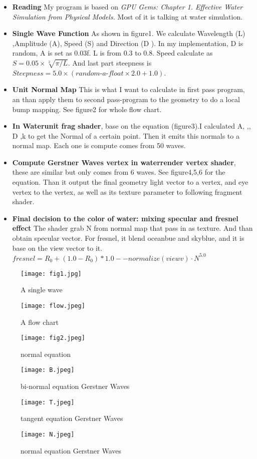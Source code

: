 \documentclass[12pt,letterpaper]{article}
\begin{document}
\begin{itemize}
\item \textbf{Reading} My program is based on \textit{GPU Gems: Chapter 1. Effective Water Simulation from Physical Models.} Most of it is talking at water simulation. 
\item \textbf{Single Wave Function} As shown in figure1. We calculate Wavelength (L) ,Amplitude (A), Speed (S) and Direction (D ). In my implementation, D is random, A is set as 0.03f. L is from 0.3 to 0.8. Speed calculate as $S = 0.05 \times \sqrt[2]{\pi/L}$. And last part steepness is $ Steepness = 5.0\times (\textit{random-a-float}\times 2.0+1.0)$.

\item \textbf{Unit Normal Map} This is what I want to calculate in first pass program, an than apply them to second pass-program to the geometry to do a local bump mapping. See figure2 for whole flow chart.
\item \textbf{In Waterunit frag shader}, base on the equation (figure3).I calculated A, \omega ,\phi , D ,k to get the Normal of a certain point. Then it emits this normals to a normal map. Each one is compute comes from 50 waves.
\item \textbf{Compute Gerstner Waves vertex in waterrender vertex shader}, these are similar but only comes from 6 waves. See figure4,5,6 for the equation. Than it output the final geometry light vector to a vertex, and eye vertex to the vertex, as well as its texture parameter to following fragment shader.
\item \textbf{Final decision to the color of water: mixing specular and fresnel effect} The shader grab N from normal map that pass in as texture. And than obtain specular vector. For fresnel, it blend oceanbue and skyblue, and it is base on the view vector to it.$fresnel = R_{0} + (1.0 - R_{0}) * {1.0 - {-normalize(viewv)}\cdot {N}}^{5.0}$


\end{itemize}
\begin{figure}[p]
    \centering
    \texttt{[image: fig1.jpg]}
    \caption{A single wave}
\end{figure}
\begin{figure}[p]
    \centering
    \texttt{[image: flow.jpeg]}
    \caption{A flow chart}
\end{figure}
\begin{figure}[p]
    \centering
    \texttt{[image: fig2.jpeg]}
    \caption{normal equation}
\end{figure}
\begin{figure}[p]
    \centering
    \texttt{[image: B.jpeg]}
    \caption{bi-normal equation Gerstner Waves}
\end{figure}
\begin{figure}[p]
    \centering
    \texttt{[image: T.jpeg]}
    \caption{tangent equation Gerstner Waves}
\end{figure}
\begin{figure}[p]
    \centering
    \texttt{[image: N.jpeg]}
    \caption{normal equation Gerstner Waves}
\end{figure}
\end{document}
